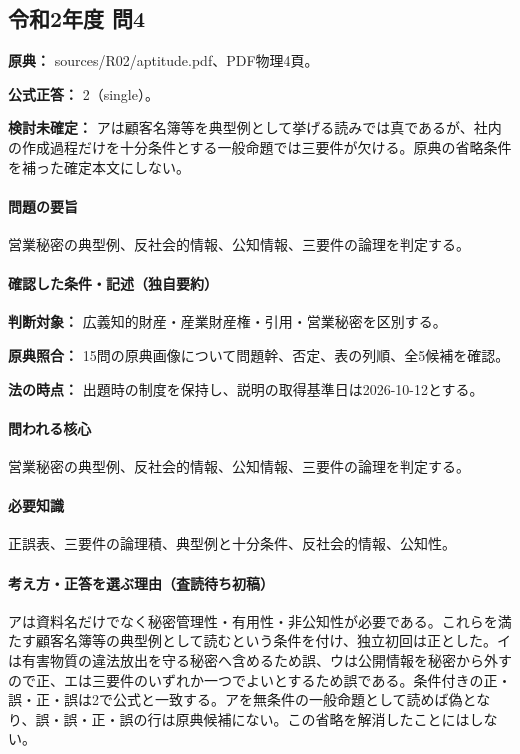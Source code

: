 \subsection{令和2年度 問4}
\label{q:r02-reg-apt-04}

\noindent\textbf{原典：} sources/R02/aptitude.pdf、PDF物理4頁。

\textbf{公式正答：} 2（single）。

\par\textbf{検討未確定：} アは顧客名簿等を典型例として挙げる読みでは真であるが、社内の作成過程だけを十分条件とする一般命題では三要件が欠ける。原典の省略条件を補った確定本文にしない。

\paragraph{問題の要旨} 営業秘密の典型例、反社会的情報、公知情報、三要件の論理を判定する。

\paragraph{確認した条件・記述（独自要約）}\mbox{}\par

\noindent\textbf{判断対象：} 広義知的財産・産業財産権・引用・営業秘密を区別する。\par

\noindent\textbf{原典照合：} 15問の原典画像について問題幹、否定、表の列順、全5候補を確認。\par

\noindent\textbf{法の時点：} 出題時の制度を保持し、説明の取得基準日は2026-10-12とする。\par

\paragraph{問われる核心} 営業秘密の典型例、反社会的情報、公知情報、三要件の論理を判定する。

\paragraph{必要知識} 正誤表、三要件の論理積、典型例と十分条件、反社会的情報、公知性。

\paragraph{考え方・正答を選ぶ理由（査読待ち初稿）} アは資料名だけでなく秘密管理性・有用性・非公知性が必要である。これらを満たす顧客名簿等の典型例として読むという条件を付け、独立初回は正とした。イは有害物質の違法放出を守る秘密へ含めるため誤、ウは公開情報を秘密から外すので正、エは三要件のいずれか一つでよいとするため誤である。条件付きの正・誤・正・誤は2で公式と一致する。アを無条件の一般命題として読めば偽となり、誤・誤・正・誤の行は原典候補にない。この省略を解消したことにはしない。

